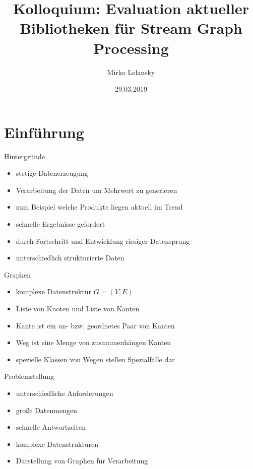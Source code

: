 \documentclass[a4paper, fontsize=11pt]{beamer}
\begin{document}
\begin{frame}
    \author{Mirko Lelansky}
    \title{Kolloquium: Evaluation aktueller Bibliotheken für Stream Graph Processing}
    \date{29.03.2019}
    \maketitle
\end{frame}

\begin{frame}
    \tableofcontents
\end{frame}

\section{Einführung}
\begin{frame}{Hintergründe}
    \begin{itemize}
        \item stetige Datenerzeugung
        \item Verarbeitung der Daten um Mehrwert zu generieren
        \item zum Beispiel welche Produkte liegen aktuell im Trend
        \item schnelle Ergebnisse gefordert
        \item durch Fortschritt und Entwicklung riesiger Datensprung
        \item unterschiedlich strukturierte Daten
    \end{itemize}
\end{frame}

\begin{frame}{Graphen}
    \begin{itemize}
        \item komplexe Datenstruktur $ G = (V,E)$
        \item Liste von Knoten und Liste von Kanten
        \item Kante ist ein un- bzw. geordnetes Paar von Kanten
        \item Weg ist eine Menge von zusammenhängen Kanten
        \item spezielle Klassen von Wegen stellen Spezialfälle dar
    \end{itemize}
\end{frame}

\begin{frame}{Problemstellung}
    \begin{itemize}
        \item unterschiedliche Anforderungen
        \item große Datenmengen
        \item schnelle Antwortzeiten
        \item komplexe Datenstrukturen
        \item Darstellung von Graphen für Verarbeitung
    \end{itemize}
\end{frame}
\end{document}
